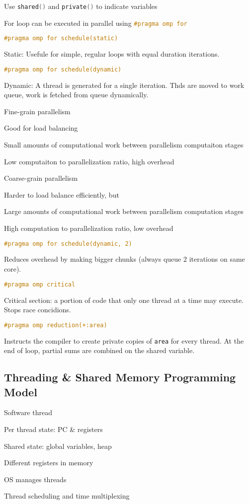 \documentclass[a4paper, fontsize=8pt, landscape, DIV=1]{scrartcl}
\makeatletter
\renewenvironment{outline}[1][]{%
  \ifthenelse{\equal{#1}{}}{}{\renewcommand{\ol@type}{#1}}%
  \ol@z%
  \newcommand{\0}{\ol@toz\ol@z}%
  \newcommand{\1}{\vspace{\dimexpr\outlinespacingscalar\baselineskip-\baselineskip}\ol@toi\ol@i\item}%
  \newcommand{\2}{\vspace{\dimexpr\outlinespacingscalartwo\baselineskip-\baselineskip}\ol@toii\ol@ii\item}%
  \newcommand{\3}{\vspace{\dimexpr\outlinespacingscalar\baselineskip-\baselineskip}\ol@toiii\ol@iii\item}%
  \newcommand{\4}{\vspace{\dimexpr\outlinespacingscalar\baselineskip-\baselineskip}\ol@toiiii\ol@iiii\item}%
}{%
  \ol@toz\ol@exit%
}
\def\outlinespacingscalar{0.5}
\def\outlinespacingscalartwo{0.5}
\makeatother
\begin{document}
\begin{multicols*}{4}
  \begin{outline}
    \1 Use \lstinline[language=C]!shared()! and \lstinline[language=C]!private()! to indicate variables
    \1 For loop can be executed in parallel using \lstinline[language=C]!#pragma omp for!
  \end{outline}

  \begin{lstlisting}[language=C]
#pragma omp for schedule(static)\end{lstlisting}
  Static: Usefule for simple, regular loops with equal duration iterations. 
  \begin{lstlisting}[language=C]
#pragma omp for schedule(dynamic)\end{lstlisting}
  Dynamic: A thread is generated for a single iteration. Thds are moved to work queue, work is fetched from
  queue dynamically.

  \begin{outline}
    \1 Fine-grain parallelism
      \2 Good for load balancing
      \2 Small amounts of computational work between parallelism computaiton stages
      \2 Low computaiton to parallelization ratio, high overhead
    \1 Coarse-grain parallelism
      \2 Harder to load balance efficiently, but
      \2 Large amounts of computational work between parallelism computation stages
      \2 High computation to parallelization ratio, low overhead
  \end{outline}

  \begin{lstlisting}[language=C]
#pragma omp for schedule(dynamic, 2)\end{lstlisting}
  Reduces overhead by making bigger chunks (always queue 2 iterations on same core).
  
  \begin{lstlisting}[language=C]
#pragma omp critical\end{lstlisting}
  Critical section: a portion of code that only one thread at a time may execute. Stops race concidions.
  
  \begin{lstlisting}[language=C]
#pragma omp reduction(+:area)\end{lstlisting}
  Instructs the compiler to create private copies of \texttt{area} for every thread. At the end of loop, 
  partial sums are combined on the shared variable.


  \subsection{Threading \& Shared Memory Programming Model}
  \begin{outline}
    \1 Software thread
      \2 Per thread state: PC \& registers
      \2 Shared state: global variables, heap
      \2 Different registers in memory
    \1 OS manages threads
      \2 Thread scheduling and time multiplexing
  \end{outline}


\end{multicols*}
\end{document}
